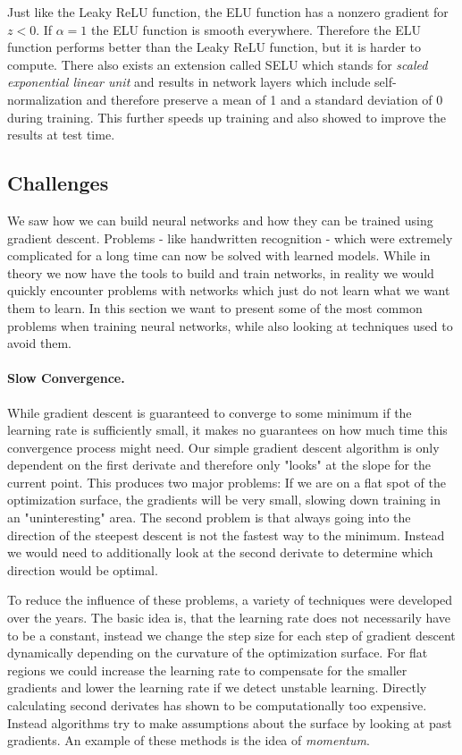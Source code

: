 \begin{enumerate}
  Just like the Leaky ReLU function, the ELU function has a nonzero gradient for $z < 0$. If $\alpha = 1$ the ELU function is smooth everywhere. Therefore the ELU function performs better than the Leaky ReLU function, but it is harder to compute. \cite{clevert2015fast} There also exists an extension called SELU which stands for \textit{scaled exponential linear unit} \cite{klambauer2017self} and results in network layers which include self-normalization and therefore preserve a mean of 1 and a standard deviation of 0 during training. This further speeds up training and also showed to improve the results at test time.
  
\end{enumerate}

\subsection{Challenges} \label{sec:NNChallenges}
We saw how we can build neural networks and how they can be trained using gradient descent. Problems - like handwritten recognition - which were extremely complicated for a long time can now be solved with learned models. While in theory we now have the tools to build and train networks, in reality we would quickly encounter problems with networks which just do not learn what we want them to learn. In this section we want to present some of the most common problems when training neural networks, while also looking at techniques used to avoid them.

\paragraph{Slow Convergence.}
While gradient descent is guaranteed to converge to some minimum if the learning rate is sufficiently small, it makes no guarantees on how much time this convergence process might need. Our simple gradient descent algorithm is only dependent on the first derivate and therefore only "looks" at the slope for the current point. This produces two major problems: If we are on a flat spot of the optimization surface, the gradients will be very small, slowing down training in an "uninteresting" area. The second problem is that always going into the direction of the steepest descent is not the fastest way to the minimum. Instead we would need to additionally look at the second derivate to determine which direction would be optimal. 

To reduce the influence of these problems, a variety of techniques were developed over the years. The basic idea is, that the learning rate does not necessarily have to be a constant, instead we change the step size for each step of gradient descent dynamically depending on the curvature of the optimization surface. For flat regions we could increase the learning rate to compensate for the smaller gradients and lower the learning rate if we detect unstable learning. Directly calculating second derivates has shown to be computationally too expensive. Instead algorithms try to make assumptions about the surface by looking at past gradients. An example of these methods is the idea of \textit{momentum}. 

